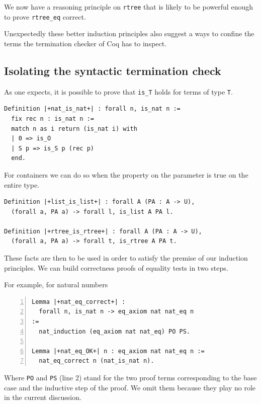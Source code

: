 \documentclass[sigplan,10pt,review]{acmart}\settopmatter{printfolios=true,printccs=false,printacmref=false}
\begin{document}
\noindent
We now have a reasoning principle on \lstinline+rtree+ that is likely
to be powerful enough to prove \lstinline+rtree_eq+ correct.

Unexpectedly these better induction principles also suggest a ways
to confine the terms the termination checker of Coq has to inspect.

\subsection{Isolating the syntactic termination check} %
\label{section:idea:transparent}

As one expects, it is possible to prove that \lstinline+is_T+
holds for terms of type \lstinline+T+.

\begin{lstlisting}
Definition |+nat_is_nat+| : forall n, is_nat n :=
  fix rec n : is_nat n :=
  match n as i return (is_nat i) with
  | 0 => is_O
  | S p => is_S p (rec p)
  end.
\end{lstlisting}

\noindent
For containers we can do so when the property on the
parameter is true on the entire type.

\begin{lstlisting}
Definition |+list_is_list+| : forall A (PA : A -> U),
  (forall a, PA a) -> forall l, is_list A PA l.

Definition |+rtree_is_rtree+| : forall A (PA : A -> U),
  (forall a, PA a) -> forall t, is_rtree A PA t.
\end{lstlisting}

\noindent
These facts are then to be used in order to satisfy the
premise of our induction principles. We can build correctness
proofs of equality tests in two steps.

For example, for natural numbers

\begin{lstlisting}[numbers=left]
Lemma |+nat_eq_correct+| :
  forall n, is_nat n -> eq_axiom nat nat_eq n
:=
  nat_induction (eq_axiom nat nat_eq) PO PS.

Lemma |+nat_eq_OK+| n : eq_axiom nat nat_eq n :=
  nat_eq_correct n (nat_is_nat n).
\end{lstlisting}

\noindent
Where \lstinline+PO+ and \lstinline+PS+ (line 2) stand for
the two proof terms corresponding to the base case and the inductive
step of the proof. We omit them because they play no role in the
current discussion.
\end{document}
